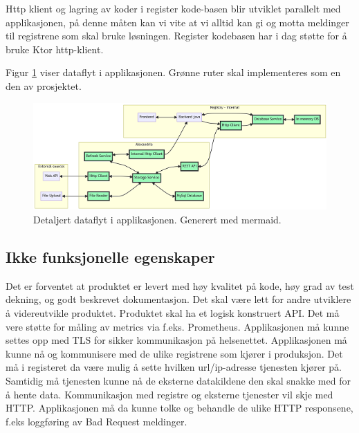 Http klient og lagring av koder i register kode-basen blir utviklet parallelt med applikasjonen, på denne måten kan vi vite at vi alltid kan gi og motta meldinger til
registrene som skal bruke løsningen. Register kodebasen har i dag støtte for å bruke Ktor http-klient.

Figur \ref{fig:dataflyt} viser dataflyt i applikasjonen. Grønne ruter skal implementeres som en den av prosjektet.
\begin{figure}[ht]
\centering
\includegraphics{images/dataflyt2.png}
\caption{Detaljert dataflyt i applikasjonen. Generert med mermaid.}
\label{fig:dataflyt}
\end{figure}

\newpage
\subsection{Ikke funksjonelle egenskaper}

Det er forventet at produktet er levert med høy kvalitet på kode, høy grad av test dekning, og godt beskrevet dokumentasjon. Det skal være lett for andre utviklere å videreutvikle produktet. Produktet skal ha et logisk konstruert API. Det må vere støtte for måling av metrics via f.eks. Prometheus. Applikasjonen må kunne settes opp med TLS for sikker kommunikasjon på helsenettet. Applikasjonen må kunne nå og kommunisere med de ulike registrene som kjører i produksjon. Det må i registeret da være mulig å sette hvilken url/ip-adresse tjenesten kjører på. Samtidig må tjenesten kunne nå de eksterne datakildene den skal snakke med for å hente data. Kommunikasjon med registre og eksterne tjenester vil skje med HTTP. Applikasjonen må da kunne tolke og behandle de ulike HTTP responsene, f.eks loggføring av Bad Request meldinger.